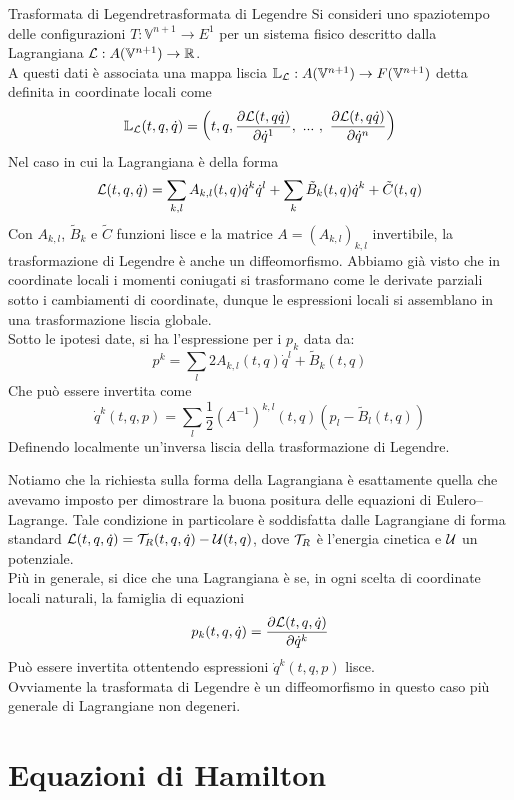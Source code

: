 \documentclass[openany]{book}
\renewcommand\V{\mathbb{V}}
\begin{document}
\begin{proposition}{Trasformata di Legendre}{trasformata di Legendre}
    Si consideri uno spaziotempo delle configurazioni $T:\V^{n+1}\to E^1$ per un sistema fisico descritto dalla Lagrangiana $\L:A(\V^{n+1})\to\R$.\\
    A questi dati è associata una mappa liscia $\Leg_\L : A(\V^{n+1})\to F(\V^{n+1})$ detta  definita in coordinate locali come 
    \[ \Leg_\L(t,q,\dot q) = \left( t, q, \frac{\partial \L(t,q\dot q)}{\partial \dot q^1},\ ...\ ,\   \frac{\partial \L(t,q\dot q)}{\partial \dot q^n}\right) \]
    Nel caso in cui la Lagrangiana è della forma
    \[ \mathcal{L}(t,q,\dot q) = \sum_{k,l}A_{k,l}(t,q)\dot q^k \dot q^l + \sum_k \tilde B_k(t,q) \dot q^k + \tilde C(t,q) \]
    Con $A_{k,l}$, $\tilde B_k$ e $\tilde C$ funzioni lisce e la matrice $A = (A_{k,l})_{k,l}$ invertibile, la trasformazione di Legendre è anche un diffeomorfismo.
    \proof 
    Abbiamo già visto che in coordinate locali i momenti coniugati si trasformano come le derivate parziali sotto i cambiamenti di coordinate, dunque le espressioni locali si assemblano in una trasformazione liscia globale.\\
    Sotto le ipotesi date, si ha l'espressione per i $p_k$ data da:
    \[ p^k = \sum_l 2A_{k,l}(t,q)\dot q^l + \tilde B_k(t,q) \]
    Che può essere invertita come 
    \[ \dot q^k(t,q,p) = \sum_{l}\frac{1}{2}(A^{-1})^{k,l}(t,q)(p_l - \tilde B_l(t,q)) \]
    Definendo localmente un'inversa liscia della trasformazione di Legendre.
\end{proposition}

Notiamo che la richiesta sulla forma della Lagrangiana è esattamente quella che avevamo imposto per dimostrare la buona positura delle equazioni di Eulero--Lagrange. Tale condizione in particolare è soddisfatta dalle Lagrangiane di forma standard $\mathcal{L}(t,q,\dot q) = \mathcal{T}_R(t,q,\dot q) - \mathcal{U}(t,q)$, dove $\mathcal{T}_R$ è l'energia cinetica e $\mathcal{U}$ un potenziale.\\
Più in generale, si dice che una Lagrangiana è  se, in ogni scelta di coordinate locali naturali, la famiglia di equazioni 
\[ p_k(t,q,\dot q) = \frac{\partial\mathcal{L}(t,q,\dot q)}{\partial\dot q^k} \]
Può essere invertita ottentendo espressioni $\dot q^k(t,q,p)$ lisce.\\
Ovviamente la trasformata di Legendre è un diffeomorfismo in questo caso più generale di Lagrangiane non degeneri.

\newpage
\section{Equazioni di Hamilton}
\end{document}
